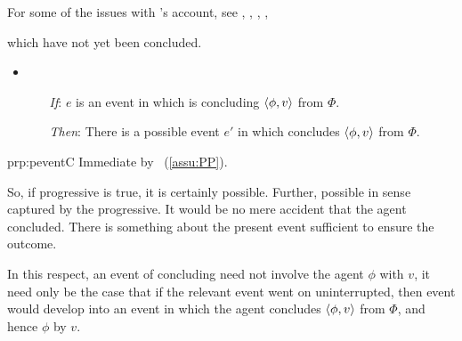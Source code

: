 \begin{note}
{    For some of the issues with \citeauthor{Landman:1992wh}'s account, see \citeauthor{Bonomi:1997uq}, \cite[49--50]{Engelberg:1999vi}, \cite[35]{Szabo:2004ul}, \cite[767]{Portner:1998um}, \textcite[esp.][1256]{Portner:2011vi}
  }
\end{note}

\begin{note}
   which have not yet been concluded.

    \begin{proposition}
    \label{prp:peventC}

    \begin{itemize}
    \item
      \begin{itemize}
      \item[\emph{If}:]
        \(e\) is an event in which \vAgent{} is concluding \(\langle \phi, v \rangle\) from \(\Phi\).
      \item[\emph{Then}:]
        There is a possible event \(e'\) in which \vAgent{} concludes \(\langle \phi, v \rangle\) from \(\Phi\).
      \end{itemize}
    \end{itemize}
    \vspace{-\baselineskip}
  \end{proposition}

  \begin{argument}{prp:peventC}
    Immediate by \assuPP{}~(\autoref{assu:PP}).
  \end{argument}
  So, if progressive is true, it is certainly possible.
  Further, possible in sense captured by the progressive.
  It would be no mere accident that the agent concluded.
  There is something about the present event sufficient to ensure the outcome.

  In this respect, an event of concluding need not involve the agent \evaling{} \(\phi\) with \(v\), it need only be the case that if the relevant event went on uninterrupted, then event would develop into an event in which the agent concludes \(\langle \phi, v \rangle\) from \(\Phi\), and hence  \(\phi\) by \(v\).
\end{note}

